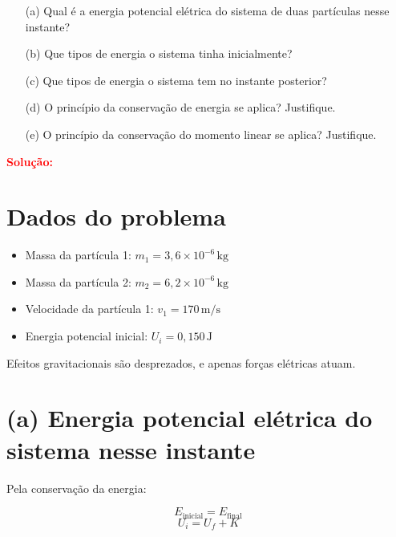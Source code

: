 \documentclass[a4paper,12pt]{article}
\begin{document}
\begin{flushleft}
\begin{center}
\end{center}

\begin{enumerate}
    \item[(a)] Qual é a energia potencial elétrica do sistema de duas partículas nesse instante?
    \item[(b)] Que tipos de energia o sistema tinha inicialmente?
    \item[(c)] Que tipos de energia o sistema tem no instante posterior?
    \item[(d)] O princípio da conservação de energia se aplica? Justifique.
    \item[(e)] O princípio da conservação do momento linear se aplica? Justifique.
\end{enumerate}

\textcolor{red}{\textbf{Solução:}}\\

\section*{Dados do problema}

\begin{itemize}
    \item Massa da partícula 1: \( m_1 = 3{,}6 \times 10^{-6} \, \text{kg} \)
    \item Massa da partícula 2: \( m_2 = 6{,}2 \times 10^{-6} \, \text{kg} \)
    \item Velocidade da partícula 1: \( v_1 = 170 \, \text{m/s} \)
    \item Energia potencial inicial: \( U_i = 0{,}150 \, \text{J} \)
\end{itemize}

Efeitos gravitacionais são desprezados, e apenas forças elétricas atuam.

\section*{(a) Energia potencial elétrica do sistema nesse instante}

Pela conservação da energia:

\begin{equation}
E_{\text{inicial}} = E_{\text{final}}
\end{equation}
\begin{equation}
U_i = U_f + K
\end{equation}


\end{flushleft}
\end{document}
